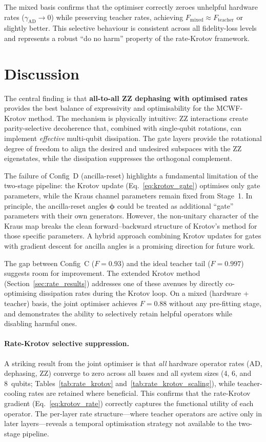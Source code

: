 \documentclass[11pt,a4paper]{article}
\begin{document}
The mixed basis confirms that the optimiser correctly zeroes unhelpful
hardware rates ($\gamma_\text{AD} \to 0$) while preserving teacher
rates, achieving $F_\text{mixed} \approx F_\text{teacher}$ or
slightly better.  This selective behaviour is consistent across all
fidelity-loss levels and represents a robust ``do no harm'' property
of the rate-Krotov framework.


\section{Discussion}

The central finding is that \textbf{all-to-all ZZ dephasing with
optimised rates} provides the best balance of expressivity and
optimisability for the MCWF-Krotov method.  The mechanism is
physically intuitive: ZZ interactions create parity-selective
decoherence that, combined with single-qubit rotations, can implement
\emph{effective} multi-qubit dissipation.  The gate layers provide the
rotational degree of freedom to align the desired and undesired
subspaces with the ZZ eigenstates, while the dissipation suppresses
the orthogonal complement.

The failure of Config~D (ancilla-reset) highlights a fundamental
limitation of the two-stage pipeline: the Krotov update
(Eq.~\ref{eq:krotov_gate}) optimises only gate parameters, while the
Kraus channel parameters remain fixed from Stage~1.  In principle,
the ancilla-reset angles $\boldsymbol\phi$ could be treated as
additional ``gate'' parameters with their own generators.  However,
the non-unitary character of the Kraus map breaks the clean
forward--backward structure of Krotov's method for those specific
parameters.  A hybrid approach combining Krotov updates for gates
with gradient descent for ancilla angles is a promising direction
for future work.

The gap between Config~C ($F = 0.93$) and the ideal teacher tail
($F = 0.997$) suggests room for improvement.  The extended Krotov
method (Section~\ref{sec:rate_results}) addresses one of these avenues
by directly co-optimising dissipation rates during the Krotov loop.
On a mixed (hardware + teacher) basis, the joint optimiser achieves
$F = 0.88$ without any pre-fitting stage, and demonstrates the ability to
selectively retain helpful operators while disabling harmful ones.

\paragraph{Rate-Krotov selective suppression.}
A striking result from the joint optimiser is that \emph{all} hardware
operator rates (AD, dephasing, ZZ) converge to zero across all bases
and all system sizes (4, 6, and 8~qubits; Tables~\ref{tab:rate_krotov}
and~\ref{tab:rate_krotov_scaling}), while teacher-cooling rates are
retained where beneficial.  This confirms that the rate-Krotov gradient
(Eq.~\ref{eq:krotov_rate}) correctly captures the functional utility of
each operator.  The per-layer rate structure---where teacher operators
are active only in later layers---reveals a temporal optimisation
strategy not available to the two-stage pipeline.
\end{document}
